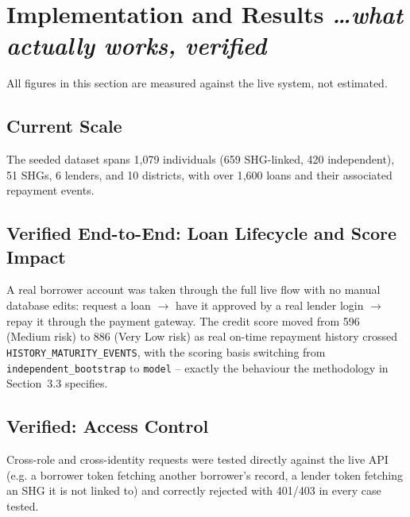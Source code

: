 \documentclass[11pt,a4paper]{article}
\newcommand{\BvrHint}[1]{%
  {\normalfont\normalsize\itshape\hfill #1}}
\begin{document}
\section{Implementation and Results%
\BvrHint{\ldots what actually works, verified}}
\label{sec:results}

All figures in this section are measured against the live system, not
estimated.

\subsection{Current Scale}
The seeded dataset spans 1{,}079 individuals (659 SHG-linked, 420
independent), 51 SHGs, 6 lenders, and 10 districts, with over 1{,}600
loans and their associated repayment events.

\subsection{Verified End-to-End: Loan Lifecycle and Score Impact}
A real borrower account was taken through the full live flow with no
manual database edits: request a loan $\to$ have it approved by a real
lender login $\to$ repay it through the payment gateway. The credit
score moved from 596 (Medium risk) to 886 (Very Low risk) as real
on-time repayment history crossed \texttt{HISTORY\_MATURITY\_EVENTS},
with the scoring basis switching from \texttt{independent\_bootstrap}
to \texttt{model} -- exactly the behaviour the methodology in
Section~3.3 specifies.

\subsection{Verified: Access Control}
Cross-role and cross-identity requests were tested directly against
the live API (e.g. a borrower token fetching another borrower's
record, a lender token fetching an SHG it is not linked to) and
correctly rejected with 401/403 in every case tested.
\end{document}
